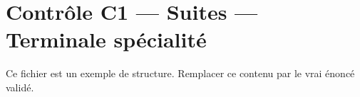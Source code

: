 \documentclass[11pt,a4paper]{article}
\begin{document}
\section*{Contrôle C1 — Suites — Terminale spécialité}

Ce fichier est un exemple de structure. Remplacer ce contenu par le vrai énoncé validé.
\end{document}
